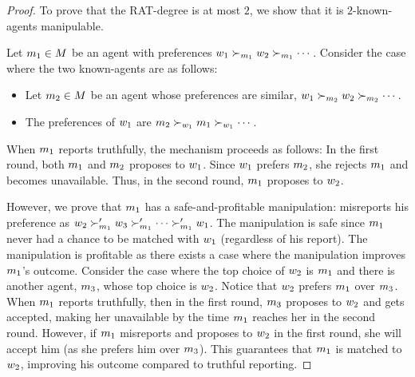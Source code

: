 \begin{proof}
    To prove that the RAT-degree is at most $2$, we show that it is $2$-known-agents manipulable.

    Let $m_1 \in M$ be an agent with preferences $w_1 \succ_{m_1} w_2 \succ_{m_1} \cdots$.
    Consider the case where the two known-agents are as follows:
    
    \begin{itemize}
        \item Let $m_2 \in M$ be an agent whose preferences are similar, $w_1 \succ_{m_2} w_2 \succ_{m_2} \cdots$.
        \item The preferences of $w_1$ are $m_2 \succ_{w_1} m_1 \succ_{w_1} \cdots$.
    \end{itemize}

When $m_1$ reports truthfully, the mechanism proceeds as follows: In the first round, both $m_1$ and $m_2$ proposes to $w_1$. Since $w_1$ prefers $m_2$, she rejects $m_1$ and becomes unavailable. Thus, in the second round, $m_1$ proposes to $w_2$.


However, we prove that $m_1$ has a safe-and-profitable manipulation: misreports his preference as $w_2 \succ'_{m_1} w_3 \succ'_{m_1} \cdots \succ'_{m_1} w_1$.
The manipulation is safe since $m_1$ never had a chance to be matched with $w_1$ (regardless of his report). 
The manipulation is profitable as there exists a case where the manipulation improves $m_1$’s outcome. Consider the case where the top choice of $w_2$ is $m_1$ and there is another agent, $m_3$, whose top choice is $w_2$. 
Notice that $w_2$ prefers $m_1$ over $m_3$. 
When $m_1$ reports truthfully, then in the first round, $m_3$ proposes to $w_2$ and gets accepted, making her unavailable by the time $m_1$ reaches her in the second round.
However, if $m_1$ misreports and proposes to $w_2$ in the first round, she will accept him (as she prefers him over $m_3$). This guarantees that $m_1$ is matched to $w_2$, improving his outcome compared to truthful reporting.
\end{proof}

